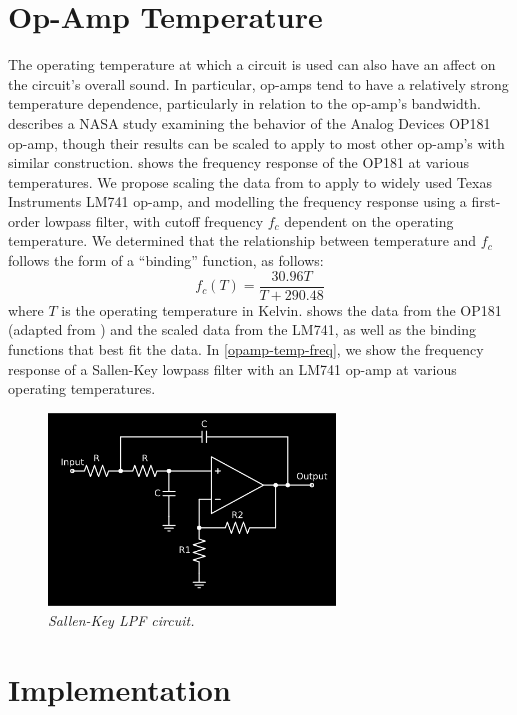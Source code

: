 \documentclass[twoside,a4paper]{article}
\begin{document}
\section{Op-Amp Temperature} \label{sec:temp}
%
The operating temperature at which a circuit is used can also have an
affect on the circuit's overall sound. In particular, op-amps tend to
have a relatively strong temperature dependence, particularly in relation
to the op-amp's bandwidth. \cite{opamp-temp} describes a NASA study
examining the behavior of the Analog Devices OP181 op-amp, though
their results can be scaled to apply to most other op-amp's with
similar construction.  shows the frequency response of the
OP181 at various temperatures.
\newline\newline
We propose scaling the data from \cite{opamp-temp} to apply to widely
used Texas Instruments LM741 op-amp, and modelling the frequency response
using a first-order lowpass filter, with cutoff frequency $f_c$ dependent
on the operating temperature. We determined that the relationship between
temperature and $f_c$ follows the form of a ``binding'' function, as follows:
%
\begin{equation}
    f_c(T) = \frac{30.96 T}{T + 290.48}  
    \label{eq:binding}
\end{equation}
%
where $T$ is the operating temperature in Kelvin.  shows
the data from the OP181 (adapted from \cite{opamp-temp}) and the scaled
data from the LM741, as well as the binding functions that best fit the
data. In \cref{opamp-temp-freq}, we show the frequency response of a
Sallen-Key lowpass filter with an LM741 op-amp at various operating
temperatures.
%
\begin{figure}[h]
    \center
    \includegraphics[width=3in]{../CMTolerance/Pics/sallen-key.png}
    \caption{\label{sallenkey}{\it Sallen-Key LPF circuit.}}
\end{figure}
%
\section{Implementation} \label{sec:impl}
%
\end{document}
